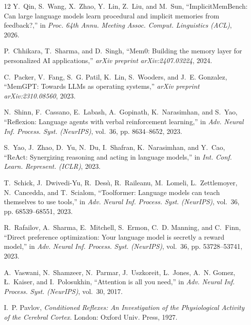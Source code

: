 \documentclass[10pt,conference]{IEEEtran}
\begin{document}
\begin{thebibliography}{12}
\fontsize{7.0pt}{7.9pt}\selectfont
\setlength{\itemsep}{0pt}
\setlength{\parskip}{0pt}
\setlength{\parsep}{0pt}
Y.~Qin, S.~Wang, X.~Zhao, Y.~Lin, Z.~Liu, and M.~Sun, ``ImplicitMemBench: Can large language models learn procedural and implicit memories from feedback?,'' in \emph{Proc. 64th Annu. Meeting Assoc. Comput. Linguistics (ACL)}, 2026.

P.~Chhikara, T.~Sharma, and D.~Singh, ``Mem0: Building the memory layer for personalized AI applications,'' \emph{arXiv preprint arXiv:2407.03224}, 2024.

C.~Packer, V.~Fang, S.~G. Patil, K.~Lin, S.~Wooders, and J.~E. Gonzalez, ``MemGPT: Towards LLMs as operating systems,'' \emph{arXiv preprint arXiv:2310.08560}, 2023.

N.~Shinn, F.~Cassano, E.~Labash, A.~Gopinath, K.~Narasimhan, and S.~Yao, ``Reflexion: Language agents with verbal reinforcement learning,'' in \emph{Adv. Neural Inf. Process. Syst. (NeurIPS)}, vol.~36, pp. 8634--8652, 2023.

S.~Yao, J.~Zhao, D.~Yu, N.~Du, I.~Shafran, K.~Narasimhan, and Y.~Cao, ``ReAct: Synergizing reasoning and acting in language models,'' in \emph{Int. Conf. Learn. Represent. (ICLR)}, 2023.

T.~Schick, J.~Dwivedi-Yu, R.~Dess{\`\i}, R.~Raileanu, M.~Lomeli, L.~Zettlemoyer, N.~Cancedda, and T.~Scialom, ``Toolformer: Language models can teach themselves to use tools,'' in \emph{Adv. Neural Inf. Process. Syst. (NeurIPS)}, vol.~36, pp. 68539--68551, 2023.

R.~Rafailov, A.~Sharma, E.~Mitchell, S.~Ermon, C.~D. Manning, and C.~Finn, ``Direct preference optimization: Your language model is secretly a reward model,'' in \emph{Adv. Neural Inf. Process. Syst. (NeurIPS)}, vol.~36, pp. 53728--53741, 2023.

A.~Vaswani, N.~Shamzeer, N.~Parmar, J.~Uszkoreit, L.~Jones, A.~N. Gomez, {\L}.~Kaiser, and I.~Polosukhin, ``Attention is all you need,'' in \emph{Adv. Neural Inf. Process. Syst. (NeurIPS)}, vol.~30, 2017.

I.~P. Pavlov, \emph{Conditioned Reflexes: An Investigation of the Physiological Activity of the Cerebral Cortex}. London: Oxford Univ. Press, 1927.


\end{thebibliography}
\end{document}
